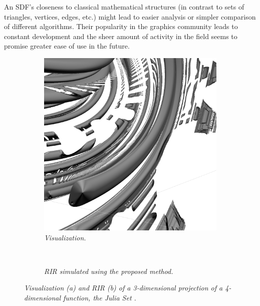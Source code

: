 \documentclass[twoside,a4paper]{article}
\begin{document}
An SDF's closeness to classical mathematical structures (in contrast to sets of triangles, vertices, edges, etc.) might lead to easier analysis or simpler comparison of different algorithms. Their popularity in the graphics community leads to constant development and the sheer amount of activity in the field seems to promise greater ease of use in the future. \
\begin{figure}[ht]
    \center
    \begin{subfigure}[t]{0.4\linewidth}
      \centering
      \includegraphics[width=1\linewidth]{img/julia.png}
    \caption{\label{fig:juliaRend} \it Visualization. }
    \end{subfigure} \

    \begin{subfigure}[t]{0.4\linewidth}
      \centering
      
      \caption{\label{fig:juliaRIR} \it RIR simulated using the proposed method. }
    \end{subfigure}
    \caption{\it Visualization (a) and RIR (b) of a 3-dimensional projection of a 4-dimensional function, the Julia Set \cite{quilez_inigo_nodate-1} .}
    \label{fig:julia}
\end{figure}
\end{document}
